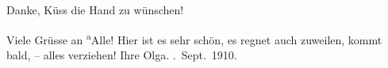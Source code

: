 \pstart
           Danke, Küss die Hand zu wünschen!\pend
           
\pstart
           Viele Grüsse an \substVorne{}\textsuperscript{a}\substDazwischen{}A\substHinten{}lle! Hier ist es sehr schön, es regnet auch zuweilen, kommt bald, – alles
               verziehen!\pend
           \pstart Ihre \spacefill\mbox{Olga.}\pend{}
. Sept. 1910.\pend
           \endnumbering{}  \newcommand{\dateiname}{L02557}\newcommand{\titel}{Olga Schnitzler an Richard und Paula Beer-Hofmann, 11. 9. 1910}\newcommand{\editorInnen}{Martin Anton Müller und Gerd-Hermann Susen}
